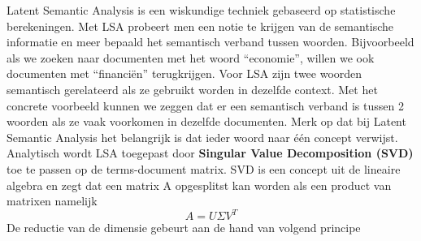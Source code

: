 Latent Semantic Analysis is een wiskundige techniek gebaseerd op statistische berekeningen. Met LSA probeert men een notie te krijgen van de semantische informatie en meer bepaald het semantisch verband tussen woorden. Bijvoorbeeld als we zoeken naar documenten met het woord ``economie'', willen we ook documenten met ``financi\"en'' terugkrijgen. Voor LSA zijn twee woorden semantisch gerelateerd als ze gebruikt worden in dezelfde context. Met het concrete voorbeeld kunnen we zeggen dat er een semantisch verband is tussen 2 woorden als ze vaak voorkomen in dezelfde documenten.
\newline
Merk op dat bij Latent Semantic Analysis het belangrijk is dat ieder woord naar \'e\'en concept verwijst.
%
\newline
Analytisch wordt LSA toegepast door \textbf{Singular Value Decomposition (SVD)} toe te passen op de terms-document matrix. SVD is een concept uit de lineaire algebra en zegt dat een matrix A opgesplitst kan worden als een product van matrixen namelijk \\
\[A = U\Sigma V^T \]
De reductie van de dimensie gebeurt aan de hand van volgend principe
%
\newcommand{\vect}{\mathbf}
\newcommand{\nul}{\operatorname{Nul}}
\newcommand{\col}{\operatorname{Kolommen }}
\newcommand{\row}{\operatorname{Rijen}}
